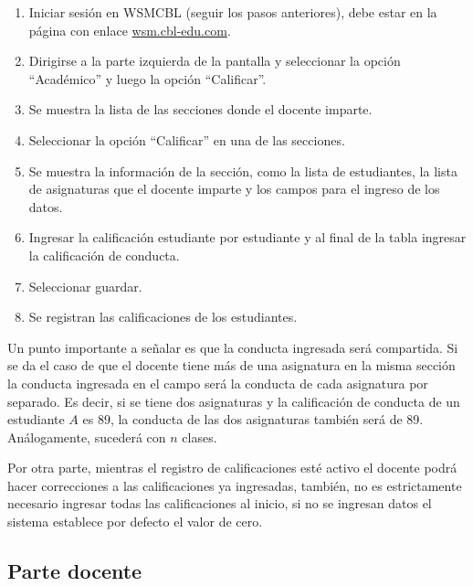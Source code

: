 \documentclass[12pt]{article}
\begin{document}
    \begin{enumerate}
        \item Iniciar sesión en WSMCBL (seguir los pasos anteriores), debe estar en la página con enlace \href{wsm.cbl-edu.com}{wsm.cbl-edu.com}.
        \item Dirigirse a la parte izquierda de la pantalla y seleccionar la opción ``Académico'' y luego la opción ``Calificar''.
        \item Se muestra la lista de las secciones donde el docente imparte.
        \item Seleccionar la opción ``Calificar'' en una de las secciones.
        \item Se muestra la información de la sección, como la lista de estudiantes, la lista de asignaturas que el docente imparte y los campos para el ingreso de los datos.
        \item Ingresar la calificación estudiante por estudiante y al final de la tabla ingresar la calificación de conducta.
        \item Seleccionar guardar.
        \item Se registran las calificaciones de los estudiantes.
    \end{enumerate}

    Un punto importante a señalar es que la conducta ingresada será compartida.
    Si se da el caso de que el docente tiene más de una asignatura en la misma sección la conducta ingresada en el campo
    será la conducta de cada asignatura por separado.
    Es decir, si se tiene dos asignaturas y la calificación de conducta de un estudiante $A$ es 89, la conducta de las
    dos asignaturas también será de 89.
    Análogamente, sucederá con $n$ clases.

    Por otra parte, mientras el registro de calificaciones esté activo el docente podrá hacer correcciones a las calificaciones
    ya ingresadas, también, no es estrictamente necesario ingresar todas las calificaciones al inicio, si no se ingresan datos
    el sistema establece por defecto el valor de cero.

    \subsection{Parte docente}
    
\end{document}
